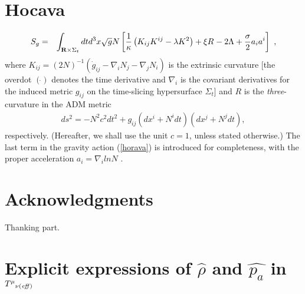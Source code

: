 \documentclass[preprint,aps,tightenlines,showkeys,nofootinbib,superscriptaddress,amsmath]{revtex4}
\newcommand{\eq}{eqnarray}
\newcommand{\La}{{\Lambda}}
\newcommand{\m}{{\mu}}
\newcommand{\n}{{\nu}}
\newcommand{\Si}{{\Sigma}}
\newcommand{\f}{\frac}
\begin{document}
\section{Hocava}

\begin{\eq}
  S_g &= & \int_{{\bf R} \times \Si_t} dt d^3 x
  \sqrt{g}N\left[\frac{1}{\kappa}\left(K_{ij}K^{ij}-\lambda
  K^2\right)+\xi R^{}-2 \La+\f{\sigma}{2} a_i a^i \right]\ ,
  \label{horava}
\end{\eq}
where
$
K_{ij}=({2N})^{-1}\left(\dot{g}_{ij}-\nabla_i
N_j-\nabla_jN_i\right)
$
is the extrinsic curvature [the overdot $(\dot{})$ denotes the time
  derivative and $\nabla_i$ is the covariant derivatives for the
induced metric $g_{ij}$ on the time-slicing hypersurface $\Si_t$] and
$R$ is the {\it three}-curvature in the ADM metric
\begin{\eq}
  \label{metric}
  ds^2=-N^2 c^2 dt^2+g_{ij}\left(dx^i+N^i dt\right)\left(dx^j+N^j
  dt\right),
\end{\eq}
respectively. (Hereafter, we shall use the unit $c=1$, unless
stated otherwise.)
The last term in the gravity action (\ref{horava}) is introduced for
completeness, with the proper acceleration $a_i=\nabla_i ln N$
\cite{Blas:2009}.

\section*{Acknowledgments}

Thanking part.

\appendix

\section{Explicit expressions of $\widehat{\rho}$ and $\widehat{p_a}$ in
  ${T^{\m}}_{\n (\it{eff})}$
}

\newcommand{\J}[4]{#1 {\bf #2} #3 (#4)}
\newcommand{\andJ}[3]{{\bf #1} (#2) #3}
\newcommand{\AP}{Ann. Phys. (N.Y.)}
\newcommand{\MPL}{Mod. Phys. Lett.}
\newcommand{\NP}{Nucl. Phys.}
\newcommand{\PL}{Phys. Lett.}
\newcommand{\PR}{Phys. Rev. D}
\newcommand{\PRL}{Phys. Rev. Lett.}
\newcommand{\PTP}{Prog. Theor. Phys.}
\newcommand{\hep}[1]{ hep-th/{#1}}
\newcommand{\hepp}[1]{ hep-ph/{#1}}
\newcommand{\hepg}[1]{ gr-qc/{#1}}
\newcommand{\bi}{ \bibitem}
\end{document}
